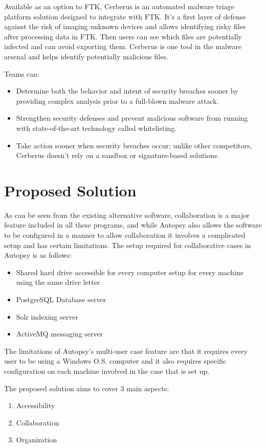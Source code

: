 Available as an option to FTK, Cerberus is an automated malware triage platform solution designed to integrate 
with FTK. It's a first layer of defense against the risk of imaging unknown devices and allows identifying 
risky files after processing data in FTK. Then users can see which files are potentially infected and can avoid 
exporting them. Cerberus is one tool in the malware arsenal and helps identify potentially malicious files.

Teams can:
\begin{itemize}
\item Determine both the behavior and intent of security breaches sooner by providing complex analysis prior 
to a full-blown malware attack. 
\item Strengthen security defenses and prevent malicious software from running with state-of-the-art technology 
called whitelisting. 
\item Take action sooner when security breaches occur; unlike other competitors, Cerberus doesn't rely on a sandbox 
or signature-based solutions. 
\end{itemize}

\section{Proposed Solution}

As can be seen from the existing alternative software, collaboration is a major feature included in all these programs, and while Autopsy also allows the software to be
configured in a manner to allow collaboration it involves a complicated setup and has certain limitations.
The setup required for collaborative cases in Autopsy is as follows:
\begin{itemize}
 \item Shared hard drive accessible for every computer setup for every machine using the same drive letter
 \item PostgreSQL Database server 
 \item Solr indexing server
 \item ActiveMQ messaging server
\end{itemize}
The limitations of Autopsy's multi-user case feature are that it requires every user to be using a Windows O.S. computer and it also requires specific configuration on each
machine involved in the case that is set up.

The proposed solution aims to cover 3 main aspects:
\begin{enumerate}
 \item Accessibility
 \item Collaboration
 \item Organization 
\end{enumerate}

